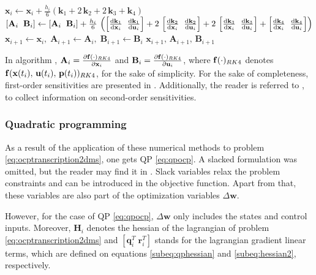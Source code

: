 \begin{algorithm}[H]
\begin{algorithmic}[1]
	\State $\mathbf{x}_i \gets \mathbf{x}_i + \frac{h_i}{6} \left( \mathbf{k}_1 + 2 \, \mathbf{k}_2 + 2 \, \mathbf{k}_3 + \mathbf{k}_4 \right)$
	\State $\left[\mathbf{A}_i \hspace{0.2cm} \mathbf{B}_i\right] \gets \left[\mathbf{A}_i \hspace{0.2cm} \mathbf{B}_i\right] + \frac{h_i}{6} \, \left( \left[\odv{\mathbf{k}_1}{\mathbf{x}_i} \hspace{0.2cm} \odv{\mathbf{k}_1}{\mathbf{u}_i}\right] + 2 \, \left[\odv{\mathbf{k}_2}{\mathbf{x}_i} \hspace{0.2cm} \odv{\mathbf{k}_2}{\mathbf{u}_i}\right] + 2 \, \left[\odv{\mathbf{k}_3}{\mathbf{x}_i} \hspace{0.2cm} \odv{\mathbf{k}_3}{\mathbf{u}_i}\right] + \left[\odv{\mathbf{k}_4}{\mathbf{x}_i} \hspace{0.2cm} \odv{\mathbf{k}_4}{\mathbf{u}_i}\right] \right)$
	\EndFor
	\State $\mathbf{x}_{i+1} \gets \mathbf{x}_i,\;\mathbf{A}_{i+1} \gets \mathbf{A}_i,\;\mathbf{B}_{i+1} \gets \mathbf{B}_i$
	\State \Return $\mathbf{x}_{i+1},\,\mathbf{A}_{i+1},\,\mathbf{B}_{i+1}$
	\end{algorithmic}
\end{algorithm}

In algorithm , $\mathbf{A}_i = \pdv{\mathbf{f}(\cdot)_{RK4}}{\mathbf{x}_i}$ and $\mathbf{B}_i = \pdv{\mathbf{f}(\cdot)_{RK4}}{\mathbf{u}_i}$, where $\mathbf{f}(\cdot)_{RK4}$ denotes $\mathbf{f}(\mathbf{x}(t_i),\,\mathbf{u}(t_i),\,\mathbf{p}(t_i))_{RK4}$, for the sake of simplicity. For the sake of completeness, first-order sensitivities are presented in . Additionally, the reader is referred to \cite{verschueren2022acados}, to collect information on second-order sensitivities.

\subsubsection*{Quadratic programming}

As a result of the application of these numerical methods to problem \eqref{eq:ocptranscription2dms}, one gets QP \eqref{eq:qpocp}. A slacked formulation was omitted, but the reader may find it in \cite{verschueren2022acados}. Slack variables relax the problem constraints and can be introduced in the objective function. Apart from that, these variables are also part of the optimization variables $\Delta \mathbf{w}$.

However, for the case of QP \eqref{eq:qpocp}, $\Delta \mathbf{w}$ only includes the states and control inputs. Moreover, $\mathbf{H}_i$ denotes the hessian of the lagrangian of problem \eqref{eq:ocptranscription2dms} and $\left[\mathbf{q}^T_i \; \mathbf{r}^T_i\right]$ stands for the lagrangian gradient linear terms, which are defined on equations \eqref{subeq:qphessian} and \eqref{subeq:hessian2}, respectively.

